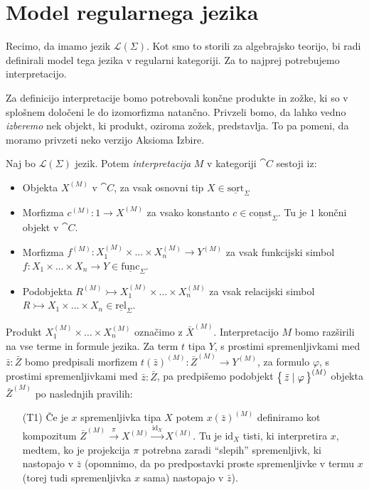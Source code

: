 \documentclass[../kategoricna_logika.tex]{subfiles}
\begin{document}
\section{Model regularnega jezika}
Recimo, da imamo jezik $\mathcal{L}(\Sigma)$.
Kot smo to storili za algebrajsko teorijo,
bi radi definirali model tega jezika v regularni kategoriji.
Za to najprej potrebujemo interpretacijo.
\begin{opomba}
  Za definicijo interpretacije bomo potrebovali končne produkte in zožke,
  ki so v splošnem določeni le do izomorfizma natančno.
  Privzeli bomo, da lahko vedno \emph{izberemo} nek objekt, ki produkt, oziroma zožek, predstavlja. To pa pomeni, da moramo privzeti neko verzijo Aksioma Izbire.
\end{opomba}
\begin{definicija}
  Naj bo $\mathcal{L}(\Sigma)$ jezik. Potem \emph{interpretacija} $M$ v kategoriji $\cat{C}$ sestoji iz:
  \begin{itemize}
    \item Objekta $X^{(M)}$ v $\cat{C}$, za vsak osnovni tip $X \in \underline{\mathrm{sort}}_\Sigma$
    \item Morfizma $c^{(M)} : 1 \to X^{(M)}$ za vsako konstanto $c \in \underline{\mathrm{const}}_\Sigma$. Tu je $1$ končni objekt v $\cat{C}$.
    \item Morfizma $f^{(M)}  : X_1^{(M)} \times \ldots \times X_n^{(M)} \to Y^{(M)}$ za vsak funkcijski simbol $f : X_1 \times \ldots \times X_n \to Y \in \underline{\mathrm{func}}_\Sigma$.
    \item Podobjekta $R^{(M)} \rightarrowtail X_1^{(M)} \times \ldots \times X_n^{(M)}$ za vsak relacijski simbol\\ $R \rightarrowtail X_1 \times \ldots \times X_n \in \underline{\mathrm{rel}}_\Sigma$.
  \end{itemize}
  Produkt $X_1^{(M)} \times \ldots \times X_n^{(M)}$ označimo z $\bar{X}^{(M)}$. 
  Interpretacijo $M$ bomo razširili na vse terme in formule jezika.
  Za term $t$ tipa $Y$, s prostimi spremenljivkami med $\bar{z} : \bar{Z}$
  bomo predpisali morfizem $t(\bar{z})^{(M)} : \bar{Z}^{(M)} \to Y^{(M)}$,
  za formulo $\varphi$, s prostimi spremenljivkami med $\bar{z} : \bar{Z}$,
  pa predpišemo podobjekt $\left\lbrace\,\bar{z} \mid \varphi\,\right\rbrace^{(M)}$
  objekta $\bar{Z}^{(M)}$ po naslednjih pravilih:
  \begin{itemize}
    \item[(T1)] Če je $x$ spremenljivka tipa $X$ potem $x(\bar{z})^{(M)}$
      definiramo kot kompozitum
      $\bar{Z}^{(M)} \xrightarrow{\pi} X^{(M)} \xrightarrow{\mathrm{id}_X} X^{(M)}$.
      Tu je $\mathrm{id}_X$ tisti, ki interpretira $x$, medtem,
      ko je projekcija $\pi$ potrebna zaradi ``slepih'' spremenljivk,
      ki nastopajo v $\bar{z}$
      (opomnimo, da po predpostavki proste spremenljivke v termu $x$
      (torej tudi spremenljivka $x$ sama) nastopajo v $\bar{z}$).


\end{itemize}
\end{definicija}
\end{document}
